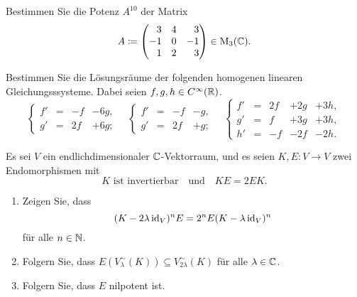 \begin{question}
  Bestimmen Sie die Potenz $A^{10}$ der Matrix
  \[
    A
    \coloneqq
    \begin{pmatrix*}[r]
       3  & 4 &  3      \\
      -1  & 0 & -1      \\
       1  & 2 &  3
    \end{pmatrix*}
    \in \Mat_3(\Cbb).
  \]
\end{question}


\begin{question}
  Bestimmen Sie die Lösungsräume der folgenden homogenen linearen Gleichungsssysteme.
  Dabei seien $f, g, h \in C^\infty(\mathbb{R})$.
  \[
    \left\{
      \begin{array}{ccrr}
        f'  & = & -f  & - 6g, \\
        g'  & = & 2f  & + 6g;
      \end{array}
    \right.
    \quad
    \left\{
      \begin{array}{ccrr}
        f'  & = & -f  & - g,  \\
        g'  & = & 2f  & + g;
      \end{array}
    \right.
    \quad
    \left\{
      \begin{array}{ccrrr}
        f'  & = & 2f  & + 2g  & + 3h, \\
        g'  & = &  f  & + 3g  & + 3h, \\
        h'  & = & -f  & - 2f  & - 2h.
      \end{array}
    \right.
  \]
\end{question}


\begin{question}
  Es sei $V$ ein endlichdimensionaler $\mathbb{C}$-Vektorraum, und es seien $K, E \colon V \to V$ zwei Endomorphismen mit
  \[
    \text{$K$ ist invertierbar}
    \quad\text{und}\quad
    KE = 2EK.
  \]
  \begin{enumerate}[leftmargin=*]
    \item
      Zeigen Sie, dass
      \[
        (K - 2 \lambda \operatorname{id}_V)^n E = 2^n E (K - \lambda \operatorname{id}_V)^n
      \]
      für alle $n \in \mathbb{N}$.
    \item
      Folgern Sie, dass $E( V^\sim_\lambda(K) ) \subseteq V^\sim_{2\lambda}(K)$ für alle $\lambda \in \mathbb{C}$.
    \item
      Folgern Sie, dass $E$ nilpotent ist.
  \end{enumerate}
\end{question}


